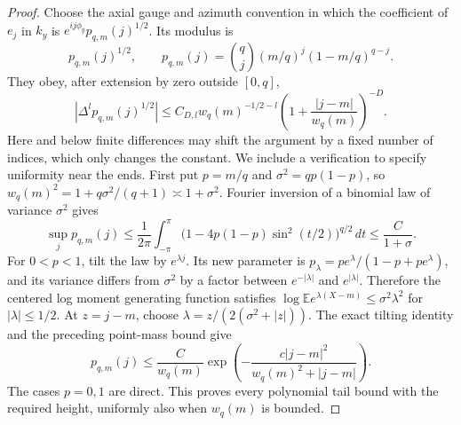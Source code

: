\begin{proof}
Choose the axial gauge and azimuth convention in which the coefficient
of $e_j$ in $k_y$ is $e^{ij\phi_y}p_{q,m}(j)^{1/2}$.  Its modulus is
\[
 p_{q,m}(j)^{1/2},\qquad
 p_{q,m}(j)=\binom qj(m/q)^j(1-m/q)^{q-j}.
\]
They obey, after extension by zero outside $[0,q]$,
\begin{equation}
 |\Delta^l p_{q,m}(j)^{1/2}|
 \leq C_{D,l}w_q(m)^{-1/2-l}
       \left(1+\frac{|j-m|}{w_q(m)}\right)^{-D}.
 \label{eq:binomial-symbol}
\end{equation}
Here and below finite differences may shift the argument by a fixed
number of indices, which only changes the constant.  We include a
verification to specify uniformity near the ends.  First put $p=m/q$
and $\sigma^2=qp(1-p)$, so
$w_q(m)^2=1+q\sigma^2/(q+1)\asymp1+\sigma^2$.
Fourier inversion of a binomial law of variance $\sigma^2$ gives
\[
 \sup_j p_{q,m}(j)\leq\frac1{2\pi}\int_{-\pi}^{\pi}
       \bigl(1-4p(1-p)\sin^2(t/2)\bigr)^{q/2}\,dt
       \leq \frac C{1+\sigma}.
\]
For $0<p<1$, tilt the law by $e^{\lambda j}$.  Its new parameter is
$p_\lambda=pe^\lambda/(1-p+pe^\lambda)$, and its variance differs
from $\sigma^2$ by a factor between $e^{-|\lambda|}$ and
$e^{|\lambda|}$.  Therefore the centered log moment generating
function satisfies
$\log\mathbb E e^{\lambda(X-m)}\leq\sigma^2\lambda^2$
for $|\lambda|\leq1/2$.  At $z=j-m$, choose
$\lambda=z/(2(\sigma^2+|z|))$.  The exact tilting identity and the
preceding point-mass bound give
\begin{equation}
 p_{q,m}(j)\leq\frac C{w_q(m)}
       \exp\left(-\frac{c|j-m|^2}{w_q(m)^2+|j-m|}\right).
 \label{eq:binomial-global-tail}
\end{equation}
The cases $p=0,1$ are direct.  This proves every polynomial tail
bound with the required height, uniformly also when $w_q(m)$ is
bounded.


\end{proof}
